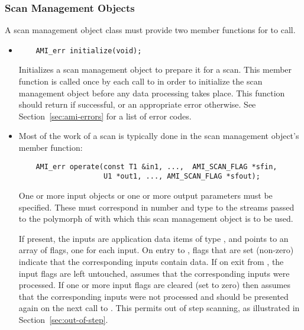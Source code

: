 \subsubsection{Scan Management Objects}  

A scan management object class must provide two member
functions for  to call. 

\begin{itemize}
    
    \item {}
\begin{verbatim}
    AMI_err initialize(void);
\end{verbatim}
    Initializes a scan management object to prepare
    it for a scan.  This member function is called once by
    each call to  in order to initialize
    the scan management object before any data processing
    takes place.  This function should return
     if successful, or an
    appropriate error otherwise. See
    Section~\ref{sec:ami-errors} for a list of error codes.
    
    \item {}
    
    Most of the work of a scan is typically done in the scan
    management object's  member function:
\begin{verbatim}
    AMI_err operate(const T1 &in1, ...,  AMI_SCAN_FLAG *sfin,
                    U1 *out1, ..., AMI_SCAN_FLAG *sfout);
\end{verbatim}
    
    One or more input objects or one or more output
    parameters must be specified.  These must correspond in
    number and type to the streams passed to the polymorph
    of  with which this scan management
    object is to be used.
    
    If present, the inputs  are application
    data items of type , and  points
    to an array of flags, one for each input.  On entry to
    , flags that are set (non-zero)
    indicate that the corresponding inputs contain data.  If
    on exit from , the input flags are
    left untouched,  assumes that the
    corresponding inputs were processed.  If one or more
    input flags are cleared (set to zero) then
     assumes that the corresponding
    inputs were not processed and should be presented again
    on the next call to .  This permits
    out of step scanning, as
    illustrated in Section~\ref{sec:out-of-step}.
    

\end{itemize}
